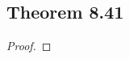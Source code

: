 \documentclass[../../main.tex]{subfiles}
\begin{document}
\subsection{Theorem 8.41}
\begin{wts}

\end{wts}
\begin{proof}

\end{proof}
\end{document}
